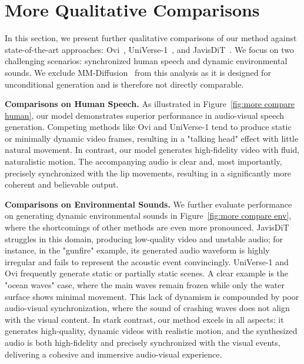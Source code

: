 \section{More Qualitative Comparisons}
\label{sec: more qualitative comparisons}

In this section, we present further qualitative comparisons of our method against state-of-the-art approaches: Ovi~\cite{low2025ovi}, UniVerse-1~\cite{wang2025universe}, and JavisDiT~\cite{liu2025javisdit}. We focus on two challenging scenarios: synchronized human speech and dynamic environmental sounds. We exclude MM-Diffusion~\cite{ruan2023mmdiffusion} from this analysis as it is designed for unconditional generation and is therefore not directly comparable.

\noindent\textbf{Comparisons on Human Speech.}
As illustrated in Figure~\ref{fig:more compare human}, our model demonstrates superior performance in audio-visual speech generation. Competing methods like Ovi and UniVerse-1 tend to produce static or minimally dynamic video frames, resulting in a "talking head" effect with little natural movement. In contrast, our model generates high-fidelity video with fluid, naturalistic motion. The accompanying audio is clear and, most importantly, precisely synchronized with the lip movements, resulting in a significantly more coherent and believable output.

\noindent\textbf{Comparisons on Environmental Sounds.}
We further evaluate performance on generating dynamic environmental sounds in Figure~\ref{fig:more compare env}, where the shortcomings of other methods are even more pronounced. JavisDiT struggles in this domain, producing low-quality video and unstable audio; for instance, in the "gunfire" example, its generated audio waveform is highly irregular and fails to represent the acoustic event convincingly. UniVerse-1 and Ovi frequently generate static or partially static scenes. A clear example is the "ocean waves" case, where the main waves remain frozen while only the water surface shows minimal movement. This lack of dynamism is compounded by poor audio-visual synchronization, where the sound of crashing waves does not align with the visual content. In stark contrast, our method excels in all aspects: it generates high-quality, dynamic videos with realistic motion, and the synthesized audio is both high-fidelity and precisely synchronized with the visual events, delivering a cohesive and immersive audio-visual experience.


